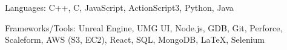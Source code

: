 

\begin{cventries}


      
\vspace{-14pt}
  \cventry
    {} %
    {} %
    {} %
    {} %
    {
      \begin{cvitems} %
        \item {Languages: C++, C, JavaScript, ActionScript3, Python, Java}
      \end{cvitems}
    }

\vspace{-14pt}
  \cventry
    {} %
    {} %
    {} %
    {} %
    {
      \begin{cvitems} %
        \item {Frameworks/Tools: Unreal Engine, UMG UI, Node.js, GDB, Git, Perforce, Scaleform, AWS (S3, EC2), React, SQL, MongoDB, \LaTeX, Selenium}
      \end{cvitems}
    }




\end{cventries}
